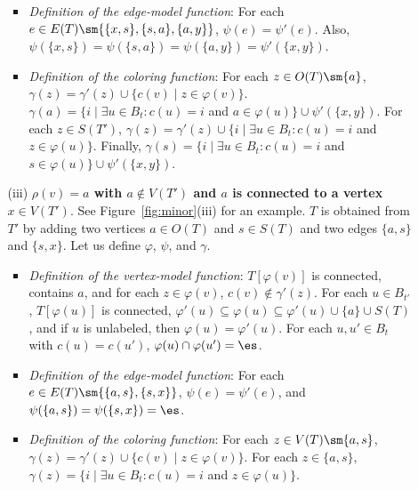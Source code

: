 \begin{enumerate}
\begin{itemize}
\begin{itemize}
\item \emph{Definition of the edge-model function}: For each $e \in E(T) \sm \{\{x,s\}, \{s,a\},\{a,y\}\}$, $\psi(e) = \psi'(e)$. Also,
  $\psi(\{x,s\}) = \psi(\{s,a\}) = \psi(\{a,y\}) = \psi'(\{x,y\})$.

\item \emph{Definition of the coloring function}: For each $z \in O(T) \sm \{a\}$, $\gamma(z) = \gamma'(z) \cup \{c(v) \mid z \in \varphi(v)\}$.  $\gamma(a) = \{i \mid \exists u \in B_t : c(u) = i$ and $ a \in \varphi(u) \} \cup \psi'(\{x,y\})$.
For each $z \in S(T')$,   $\gamma(z) = \gamma'(z) \cup \{i \mid \exists u \in B_t : c(u) = i$ and $ z \in \varphi(u) \}$. Finally, $\gamma(s) = \{i \mid \exists u \in B_t : c(u) = i$ and $s \in \varphi(u) \} \cup \psi'(\{x,y\})$.

\end{itemize}

\medskip
\item[(iii)] \textbf{$\rho(v)=a$  with $a \notin V(T')$ and $a$ is connected to a vertex $x \in V(T')$}. See Figure~\ref{fig:minor}(iii) for an example.
 $T$ is obtained from $T'$ by adding two vertices $a\in O(T)$ and $s \in S(T)$ and two edges $\{a,s\}$ and $\{s,x\}$. Let us define $\varphi$, $\psi$, and $\gamma$.
\begin{itemize}
\item \emph{Definition of the vertex-model function}:
$T[\varphi(v)]$ is connected, contains $a$, and for each $z \in \varphi(v)$, $c(v) \not \in \gamma'(z)$.
For each $u \in B_{t'}$, $T[\varphi(u)]$ is connected, $\varphi'(u) \subseteq \varphi(u) \subseteq \varphi'(u) \cup \{a\} \cup S(T)$, and
 if $u$ is unlabeled, then $\varphi(u) = \varphi'(u)$.
For each $u,u' \in B_{t}$ with $c(u) = c(u')$, $\varphi(u) \cap \varphi(u') = \es$.

\item \emph{Definition of the edge-model function}:
For each $e \in E(T) \sm \{\{a,s\}, \{s,x\}\}$, $\psi(e) = \psi'(e)$, and
  $\psi(\{a,s\}) = \psi(\{s,x\}) = \es$.

\item \emph{Definition of the coloring function}:
  For each $z \in V(T) \sm \{a,s\}$, $\gamma(z) = \gamma'(z) \cup \{c(v) \mid z \in \varphi(v)\}$.
  For each $z \in \{a,s\}$, $\gamma(z) = \{i \mid \exists u \in B_t : c(u) = i$ and $ z \in \varphi(u) \}$.
\end{itemize}


\end{itemize}
\end{enumerate}
